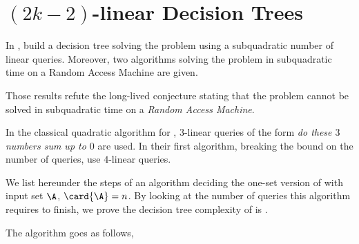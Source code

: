 \section{$(2k-2)$-linear Decision Trees}

In \cite{gronlund:2014}, \citeauthor{gronlund:2014} build a decision tree
solving the \threeSUM problem using a subquadratic number of linear queries.
Moreover, two algorithms solving the \threeSUM problem in subquadratic time on
a Random Access Machine are
given.

Those results refute the long-lived conjecture stating that the \threeSUM problem
cannot be solved in subquadratic time on a \emph{Random Access Machine}.

In the classical quadratic algorithm for \threeSUM, $3$-linear queries of the
form \emph{do these $3$ numbers sum up to $0$} are used. In their first
algorithm, breaking the  bound on the number of queries,
\citeauthor{gronlund:2014} use $4$-linear queries.

We list hereunder the steps of an algorithm deciding the one-set
version of \threeSUM with input set $\A$, $\card{\A} = n$. By looking at the
number of queries this algorithm requires to finish, we prove the
decision tree complexity of \threeSUM is .

The algorithm goes as follows,

